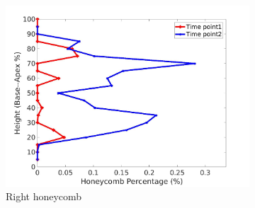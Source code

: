 \begin{figure}[H]
\begin{subfigure}{.42\linewidth}
  \includegraphics[width=\linewidth,trim={{.0\wd0} {.0\wd0} {.0\wd0} {.0\wd0}},clip]{Appendix/Image_AppexA/BaseToApex/IPF13RightLungHoneycombDiseaseAgainstHeight.jpg}
  \caption{Right honeycomb}
  \label{fig:IPF13DiseaseAgainstHeight-f}
\end{subfigure}
\begin{subfigure}{.42\linewidth}%

\end{subfigure}
\end{figure}
